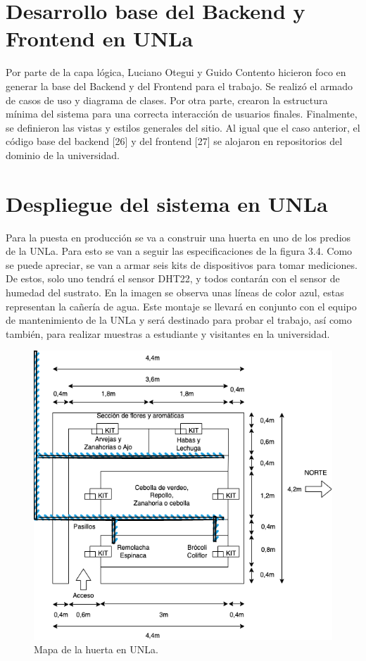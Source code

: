 
\section{Desarrollo base del Backend y Frontend en UNLa}
Por parte de la capa lógica, Luciano Otegui y Guido Contento hicieron foco en generar la base del Backend y del Frontend para el trabajo. Se realizó el armado de casos de uso y diagrama de clases. Por otra parte, crearon la estructura mínima del sistema para una correcta interacción de usuarios finales. Finalmente, se definieron las vistas y estilos generales del sitio. Al igual que el caso anterior, el código base del backend [26] y del frontend [27] se alojaron en repositorios del dominio de la universidad.\\


\section{Despliegue del sistema en UNLa}

Para la puesta en producción se va a construir una huerta en uno de los predios de la UNLa. Para esto se van a seguir las especificaciones de la figura 3.4. Como se puede apreciar, se van a armar seis kits de dispositivos para tomar mediciones. De estos, solo uno tendrá el sensor DHT22, y todos contarán con el sensor de humedad del sustrato. En la imagen se observa unas líneas de color azul, estas representan la cañería de agua. Este montaje se llevará en conjunto con el equipo de mantenimiento de la UNLa y será destinado para probar el trabajo, así como también, para realizar muestras a estudiante y visitantes en la universidad.

\begin{figure}[htpb]
\centering 
\includegraphics[width=.7\textwidth]{./Figures/despliegue.png}
\caption{Mapa de la huerta en UNLa.}
\label{fig:diagBloques}
\end{figure}

